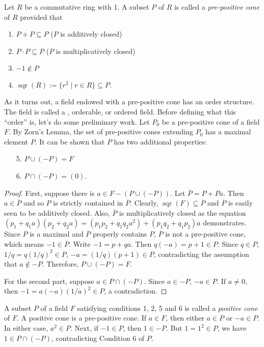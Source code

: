 \documentclass[12pt]{article}
\begin{document}

Let $R$ be a commutative ring with 1.  A subset $P$ of $R$ is called a \emph{pre-positive cone} of $R$ provided that 
\begin{enumerate}
\item
$P+P\subseteq P$ ($P$ is additively closed)
\item
$P\cdot P\subseteq P$ ($P$ is multiplicatively closed)
\item
$-1\notin P$
\item
$\operatorname{sqr}(R):=\lbrace r^2\mid r\in R\rbrace \subseteq P.$
\end{enumerate}
As it turns out, a field endowed with a pre-positive cone has an order structure.  The field is called a , orderable, or ordered field.  Before defining what this ``order'' is, let's do some preliminary work.  Let $P_0$ be a pre-positive cone of a field $F$.  By Zorn's Lemma, the set of pre-positive cones extending $P_0$ has a maximal element $P$.  It can be shown that $P$ has two additional properties:
\begin{enumerate}
\item[5.]
$P\cup (-P)=F$
\item[6.]
$P\cap (-P)=(0).$
\end{enumerate}
\begin{proof}  First, suppose there is $a\in F-(P\cup (-P))$.  Let $\overline{P}=P+Pa$.  Then $a\in\overline{P}$ and so $P$ is strictly contained in $\overline{P}$.  Clearly, $\operatorname{sqr}(F)\subseteq \overline{P}$ and $\overline{P}$ is easily seen to be additively closed.  Also, $\overline{P}$ is multiplicatively closed as the equation $(p_1+q_1a)(p_2+q_2a)=(p_1p_2+q_1q_2a^2)+(p_1q_2+q_1p_2)a$ demonstrates.  Since $P$ is a maximal and $\overline{P}$ properly contains $P$, $\overline{P}$ is not a pre-positive cone, which means $-1\in \overline{P}$.  Write $-1=p+qa$.  Then $q(-a)=p+1\in P$.  Since $q\in P$, $1/q=q(1/q)^2\in P$, $-a=(1/q)(p+1)\in P$, contradicting the assumption that $a\notin -P$.  Therefore, $P\cup (-P)=F$.

For the second part, suppose $a\in P\cap (-P)$.  Since $a\in -P$, $-a\in P$.  If $a\neq 0$, then $-1=a(-a)(1/a)^2\in P$, a contradiction. 
\end{proof}

A subset $P$ of a field $F$ satisfying conditions 1, 2, 5 and 6 is called a \emph{positive cone} of $F$.  
A positive cone is a pre-positive cone.  If $a\in F$, then either $a\in P$ or $-a\in P$.  In either case, $a^2\in P$.  
Next, if $-1\in P$, then $1\in -P$.  But $1=1^2\in P$, we have $1\in P\cap (-P)$, contradicting Condition 6 of $P$. 
\end{document}
